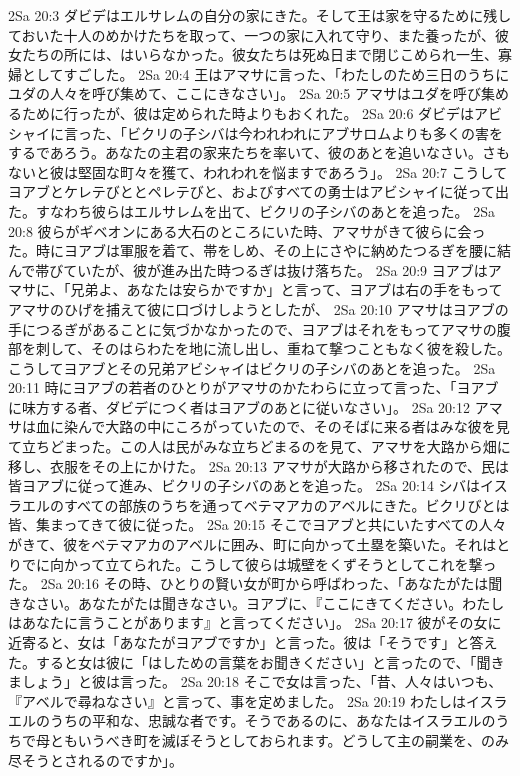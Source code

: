 2Sa 20:3  ダビデはエルサレムの自分の家にきた。そして王は家を守るために残しておいた十人のめかけたちを取って、一つの家に入れて守り、また養ったが、彼女たちの所には、はいらなかった。彼女たちは死ぬ日まで閉じこめられ一生、寡婦としてすごした。
2Sa 20:4  王はアマサに言った、「わたしのため三日のうちにユダの人々を呼び集めて、ここにきなさい」。
2Sa 20:5  アマサはユダを呼び集めるために行ったが、彼は定められた時よりもおくれた。
2Sa 20:6  ダビデはアビシャイに言った、「ビクリの子シバは今われわれにアブサロムよりも多くの害をするであろう。あなたの主君の家来たちを率いて、彼のあとを追いなさい。さもないと彼は堅固な町々を獲て、われわれを悩ますであろう」。
2Sa 20:7  こうしてヨアブとケレテびととペレテびと、およびすべての勇士はアビシャイに従って出た。すなわち彼らはエルサレムを出て、ビクリの子シバのあとを追った。
2Sa 20:8  彼らがギベオンにある大石のところにいた時、アマサがきて彼らに会った。時にヨアブは軍服を着て、帯をしめ、その上にさやに納めたつるぎを腰に結んで帯びていたが、彼が進み出た時つるぎは抜け落ちた。
2Sa 20:9  ヨアブはアマサに、「兄弟よ、あなたは安らかですか」と言って、ヨアブは右の手をもってアマサのひげを捕えて彼に口づけしようとしたが、
2Sa 20:10  アマサはヨアブの手につるぎがあることに気づかなかったので、ヨアブはそれをもってアマサの腹部を刺して、そのはらわたを地に流し出し、重ねて撃つこともなく彼を殺した。こうしてヨアブとその兄弟アビシャイはビクリの子シバのあとを追った。
2Sa 20:11  時にヨアブの若者のひとりがアマサのかたわらに立って言った、「ヨアブに味方する者、ダビデにつく者はヨアブのあとに従いなさい」。
2Sa 20:12  アマサは血に染んで大路の中にころがっていたので、そのそばに来る者はみな彼を見て立ちどまった。この人は民がみな立ちどまるのを見て、アマサを大路から畑に移し、衣服をその上にかけた。
2Sa 20:13  アマサが大路から移されたので、民は皆ヨアブに従って進み、ビクリの子シバのあとを追った。
2Sa 20:14  シバはイスラエルのすべての部族のうちを通ってベテマアカのアベルにきた。ビクリびとは皆、集まってきて彼に従った。
2Sa 20:15  そこでヨアブと共にいたすべての人々がきて、彼をベテマアカのアベルに囲み、町に向かって土塁を築いた。それはとりでに向かって立てられた。こうして彼らは城壁をくずそうとしてこれを撃った。
2Sa 20:16  その時、ひとりの賢い女が町から呼ばわった、「あなたがたは聞きなさい。あなたがたは聞きなさい。ヨアブに、『ここにきてください。わたしはあなたに言うことがあります』と言ってください」。
2Sa 20:17  彼がその女に近寄ると、女は「あなたがヨアブですか」と言った。彼は「そうです」と答えた。すると女は彼に「はしための言葉をお聞きください」と言ったので、「聞きましょう」と彼は言った。
2Sa 20:18  そこで女は言った、「昔、人々はいつも、『アベルで尋ねなさい』と言って、事を定めました。
2Sa 20:19  わたしはイスラエルのうちの平和な、忠誠な者です。そうであるのに、あなたはイスラエルのうちで母ともいうべき町を滅ぼそうとしておられます。どうして主の嗣業を、のみ尽そうとされるのですか」。
